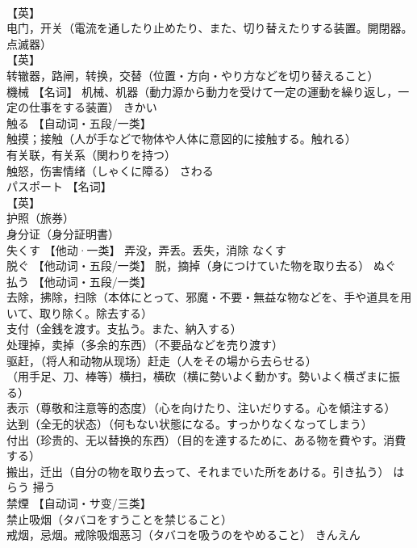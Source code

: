 \documentclass[8pt]{extreport}
\begin{document}
\begin{CJK}{UTF8}{min}
\\	【英】
\\	电门，开关（電流を通したり止めたり、また、切り替えたりする装置。開閉器。点滅器） 
\\	【英】
\\	转辙器，路闸，转换，交替（位置・方向・やり方などを切り替えること）		
\\	機械	【名词】 机械、机器（動力源から動力を受けて一定の運動を繰り返し，一定の仕事をする装置）	きかい	
\\	触る	【自动词・五段/一类】 
\\	触摸；接触（人が手などで物体や人体に意図的に接触する。触れる） 
\\	有关联，有关系（関わりを持つ） 
\\	触怒，伤害情绪（しゃくに障る）	さわる	
\\	パスポート	【名词】 
\\	【英】
\\	护照（旅券） 
\\	身分证（身分証明書）		
\\	失くす	【他动·一类】 弄没，弄丢。丢失，消除	なくす	
\\	脱ぐ	【他动词・五段/一类】 脱，摘掉（身につけていた物を取り去る）	ぬぐ	
\\	払う	【他动词・五段/一类】 
\\	去除，拂除，扫除（本体にとって、邪魔・不要・無益な物などを、手や道具を用いて、取り除く。除去する） 
\\	支付（金銭を渡す。支払う。また、納入する） 
\\	处理掉，卖掉（多余的东西）（不要品などを売り渡す） 
\\	驱赶，（将人和动物从现场）赶走（人をその場から去らせる） 
\\	（用手足、刀、棒等）横扫，横砍（横に勢いよく動かす。勢いよく横ざまに振る） 
\\	表示（尊敬和注意等的态度）（心を向けたり、注いだりする。心を傾注する） 
\\	达到（全无的状态）（何もない状態になる。すっかりなくなってしまう） 
\\	付出（珍贵的、无以替换的东西）（目的を達するために、ある物を費やす。消費する） 
\\	搬出，迁出（自分の物を取り去って、それまでいた所をあける。引き払う）	はらう	掃う
\\	禁煙	【自动词・サ变/三类】 
\\	禁止吸烟（タバコをすうことを禁じること） 
\\	戒烟，忌烟。戒除吸烟恶习（タバコを吸うのをやめること）	きんえん	

\end{CJK}
\end{document}
